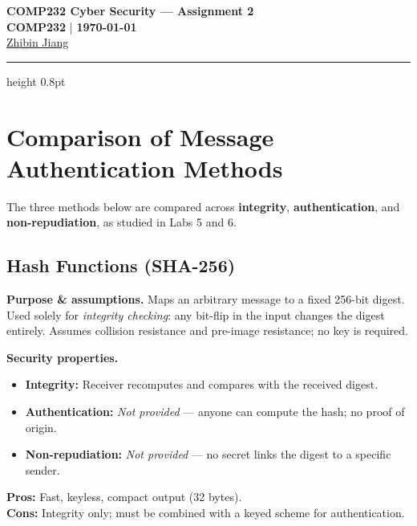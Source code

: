 \documentclass[twocolumn, 10pt]{article}
\begin{document}
\begin{center}
    {\Large \textbf{COMP232 Cyber Security --- Assignment 2}} \\[0.3em]
    \textbf{COMP232} \quad | \quad \textbf{\today} \\[0.4em]
    {\small \href{mailto:sgzjia24@liverpool.ac.uk}{Zhibin Jiang}}
    \vspace{0.2em}
    \hrule height 0.8pt
\end{center}

\section{Comparison of Message Authentication Methods}

The three methods below are compared across \textbf{integrity}, \textbf{authentication}, and \textbf{non-repudiation}, as studied in Labs 5 and 6.

\subsection{Hash Functions (SHA-256)}

\textbf{Purpose \& assumptions.} Maps an arbitrary message to a fixed 256-bit digest. Used solely for \emph{integrity checking}: any bit-flip in the input changes the digest entirely. Assumes collision resistance and pre-image resistance; no key is required.

\textbf{Security properties.}
\begin{itemize}[leftmargin=*, itemsep=0pt, topsep=1pt]
    \item \textbf{Integrity:} Receiver recomputes  and compares with the received digest.
    \item \textbf{Authentication:} \emph{Not provided} --- anyone can compute the hash; no proof of origin.
    \item \textbf{Non-repudiation:} \emph{Not provided} --- no secret links the digest to a specific sender.
\end{itemize}

\textbf{Pros:} Fast, keyless, compact output (32 bytes).\\
\textbf{Cons:} Integrity only; must be combined with a keyed scheme for authentication.
\end{document}
